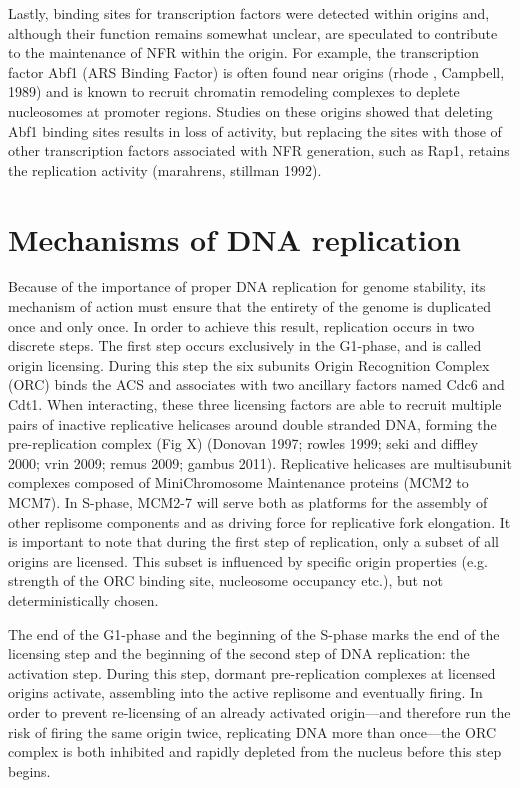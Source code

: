 Lastly, binding sites for transcription factors were detected within origins and, although their function remains somewhat unclear, are speculated to contribute to the maintenance of NFR within the origin. For example, the transcription factor Abf1 (ARS Binding Factor) is often found near origins (rhode , Campbell, 1989) and is known to recruit chromatin remodeling complexes to deplete nucleosomes at promoter regions. Studies on these origins showed that deleting Abf1 binding sites results in loss of activity, but replacing the sites with those of other transcription factors associated with NFR generation, such as Rap1, retains the replication activity (marahrens, stillman 1992).

\section{Mechanisms of DNA replication}

Because of the importance of proper DNA replication for genome stability, its mechanism of action must ensure that the entirety of the genome is duplicated once and only once. In order to achieve this result, replication occurs in two discrete steps. The first step occurs exclusively in the G1-phase, and is called origin licensing. During this step the six subunits Origin Recognition Complex (ORC) binds the ACS and associates with two ancillary factors named Cdc6 and Cdt1. When interacting, these three licensing factors are able to recruit multiple pairs of inactive replicative helicases around double stranded DNA, forming the pre-replication complex (Fig X) (Donovan 1997; rowles 1999; seki and diffley 2000; vrin 2009; remus 2009; gambus 2011).  Replicative helicases are multisubunit complexes composed of MiniChromosome Maintenance proteins (MCM2 to MCM7). In S-phase, MCM2-7 will serve both as platforms for the assembly of other replisome components and as driving force for replicative fork elongation. It is important to note that during the first step of replication, only a subset of all origins are licensed. This subset is influenced by specific origin properties (e.g. strength of the ORC binding site, nucleosome occupancy etc.), but not deterministically chosen.

The end of the G1-phase and the beginning of the S-phase marks the end of the licensing step and the beginning of the second step of DNA replication: the activation step. During this step, dormant pre-replication complexes at licensed origins activate, assembling into the active replisome and eventually firing. In order to prevent re-licensing of an already activated origin—and therefore run the risk of firing the same origin twice, replicating DNA more than once—the ORC complex is both inhibited and rapidly depleted from the nucleus before this step begins. 

